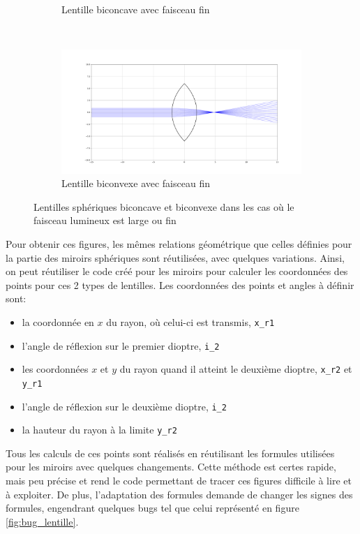 \documentclass[a4paper, 11pt]{article}
\begin{document}
\begin{figure}[H]
\begin{subfigure}[t]{0.45\linewidth}
		\caption{Lentille biconcave avec faisceau fin}
		\label{fig:conc_stig}
    \end{subfigure}
    ~
    \begin{subfigure}[t]{0.45\linewidth}
    	\centering
		\includegraphics[width=\linewidth]{Figures/Figures_lentilles/biconvexe_stig.pdf}
		\caption{Lentille biconvexe avec faisceau fin}
		\label{fig:conv_stig}
    \end{subfigure}

    \caption{Lentilles sphériques biconcave et biconvexe dans les cas où le faisceau lumineux est large ou fin}
    \label{fig:lentilles}
\end{figure}

Pour obtenir ces figures, les mêmes relations géométrique que celles définies pour la partie des miroirs sphériques sont réutilisées, avec quelques variations. Ainsi, on peut réutiliser le code créé pour les miroirs pour calculer les coordonnées des points pour ces 2 types de lentilles. Les coordonnées des points et angles à définir sont:
\begin{itemize}
	\item la coordonnée en $x$ du rayon, où celui-ci est transmis, \verb|x_r1|
	\item l'angle de réflexion sur le premier dioptre, \verb|i_2|
	\item les coordonnées $x$ et $y$ du rayon quand il atteint le deuxième dioptre, \verb|x_r2| et \verb|y_r1|
	\item l'angle de réflexion sur le deuxième dioptre, \verb|i_2|
	\item la hauteur du rayon à la limite \verb|y_r2|
\end{itemize}

Tous les calculs de ces points sont réalisés en réutilisant les formules utilisées pour les miroirs avec quelques changements. Cette méthode est certes rapide, mais peu précise et rend le code permettant de tracer ces figures difficile à lire et à exploiter. De plus, l'adaptation des formules demande de changer les signes des formules, engendrant quelques bugs tel que celui représenté en figure \ref{fig:bug_lentille}.
\end{document}
